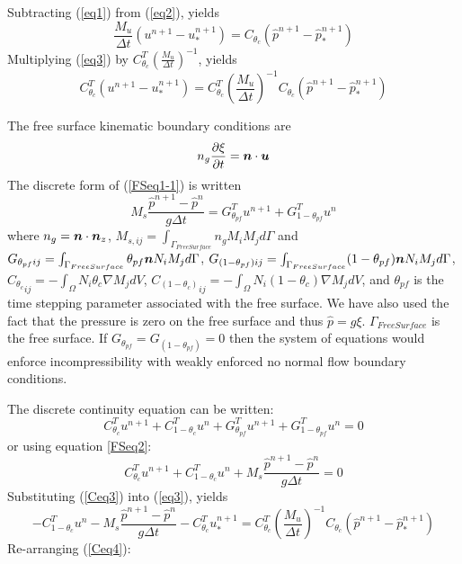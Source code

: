 \noindent Subtracting (\ref{eq1}) from (\ref{eq2}), yields
\begin{equation}
\frac{M_u}{\Delta t}(u^{n+1}-u_*^{n+1})= C_{\theta_c} ({\hat p}^{n+1}-{\hat p}_*^{n+1})
\label{u-eqn}
\end{equation}
\noindent Multiplying (\ref{eq3}) by $C_{\theta_c}^T (\frac{M_u}{\Delta t})^{-1}$, yields
\begin{equation}
C_{\theta_c}^T (u^{n+1}-u_*^{n+1})=
C_{\theta_c}^T \left(\frac{M_u}{\Delta t}\right)^{-1}
C_{\theta_c} ({\hat p}^{n+1}-{\hat p}_*^{n+1})
\label{eq3}
\end{equation}

\noindent The free surface kinematic boundary conditions are
\begin{equation}
 n_g\frac{\partial \xi}{\partial t} = {\mbox{\boldmath$n$}} \cdot {\mbox{\boldmath$u$}}
\label{FSeq1-1}
\end{equation}
\noindent The discrete form of (\ref{FSeq1-1}) is written
\begin{equation}
 M_s\frac{{\hat p}^{n+1}-{\hat p}^n}{g \Delta t} =
G_{{\theta_{pf}}}^T u^{n+1}  +G_{{1-\theta_{pf}}}^T u^{n}
\label{FSeq2}
\end{equation}
where $n_g={\mbox{\boldmath$n$}}\cdot {\mbox{\boldmath$n$}}_z$,
$M_{s,ij}=\int_{\Gamma_{Free Surface}}n_gM_iM_j d \Gamma$
 and $G_{\theta_{pf} ij}=\int_{\Gamma_{Free Surface}}\theta_{pf} {\mbox{\boldmath$n$}}  N_iM_j d \Gamma $,
 $G_{(1-\theta_{pf}) ij}=\int_{\Gamma_{Free Surface}}(1-\theta_{pf}) {\mbox{\boldmath$n$}}  N_iM_j d \Gamma $,
 ${C_{\theta_c}}_{ij}=-\int_\Omega N_i \theta_c \nabla M_j d V$,
 ${C_{(1-\theta_c)}}_{ij}=-\int_\Omega N_i (1-\theta_c) \nabla M_j d V$,
 and $\theta_{pf}$ is the time stepping parameter associated with the free surface. We have
 also used the fact that the pressure is zero on the free surface
 and thus ${\hat p}=g\xi$.
$\Gamma_{Free Surface}$ is the free surface.
If $G_{\theta_{pf}}=G_{(1-\theta_{pf})}=0$ then the system
of equations would enforce incompressibility with weakly enforced no normal flow
boundary conditions.

\noindent
The discrete continuity equation can be written:
\begin{equation}
C_{\theta_c}^T u^{n+1}+C_{1-\theta_c}^T u^{n}
 +G_{{\theta_{pf}}}^T u^{n+1}  +G_{{1-\theta_{pf}}}^T u^{n} =0
\label{Ceq2}
\end{equation}
or using equation \ref{FSeq2}:
\begin{equation}
C_{\theta_c}^T u^{n+1}+C_{1-\theta_c}^T u^{n}
+M_s\frac{{\hat p}^{n+1}-{\hat p}^n}{g \Delta t}=0
\label{Ceq3}
\end{equation}
Substituting (\ref{Ceq3}) into (\ref{eq3}), yields
\begin{equation}
-C_{1-\theta_c}^T u^{n}
-M_s\frac{{\hat p}^{n+1}-{\hat p}^n}{g \Delta t}-C_{\theta_c}^T u_*^{n+1}
=
C_{\theta_c}^T \left(\frac{M_u}{\Delta t}\right)^{-1}C_{\theta_c}
({\hat p}^{n+1}-{\hat p}_*^{n+1})
\label{Ceq4}
\end{equation}
Re-arranging (\ref{Ceq4}):

